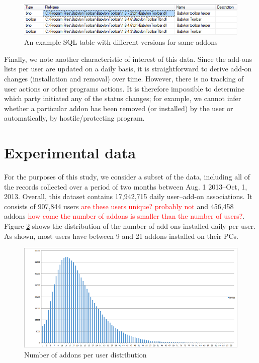 \documentclass[11pt,oneside]{book}
\let\Oldsection\section
\renewcommand{\section}{\FloatBarrier\Oldsection}
\begin{document}
\begin{figure}[t]
\centering
\begin{small}
\includegraphics[scale=.8,angle=0]{figures/addons_versioning_snapshot.png}
\end{small}
\caption{An example SQL table with different versions for same addons}
\label{fig:addons_versioning_snapshot}
\end{figure}

Finally, we note another characteristic of interest of this data.  Since the add-ons lists per user are updated on a daily basis, it is straightforward to derive add-on changes (installation and removal) over time. However, there is no tracking of user actions or other programs actions. It is therefore impossible to determine which party initiated any of the status changes; for example, we cannot infer whether a particular addon has been removed (or installed) by the user or automatically, by hostile/protecting program. 

\section{Experimental data}

For the purposes of this study, we consider a subset of the data, including all of the records collected over a  period of two months between Aug. 1 2013--Oct, 1, 2013. Overall, this dataset contains 17,942,715 daily user--add-on associations. It consists of 907,844 users \textcolor{red}{are these users unique? probably not} and 456,458 addons \textcolor{red}{how come the number of addons is smaller than the number of users?}. Figure \ref{fig:user_addons_histogram} shows the distribution of the number of add-ons installed daily per user. As shown,  most users have between 9 and 21 addons installed on their PCs.

\begin{figure}[t]
\centering
\begin{small}
\includegraphics[scale=.9,angle=0]{figures/user_addons_histogram.png}
\end{small}
\caption{Number of addons per user distribution}
\label{fig:user_addons_histogram}
\end{figure}
\end{document}
